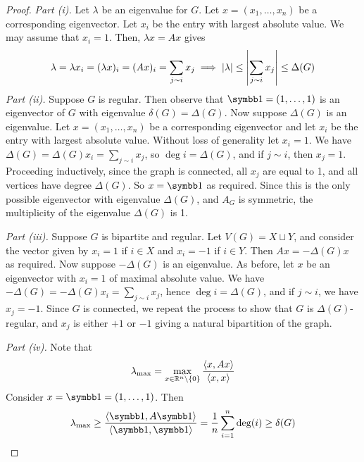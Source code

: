 \begin{proof}
	\emph{Part (i).}
	Let \( \lambda \) be an eigenvalue for \( G \).
	Let \( x = (x_1, \dots, x_n) \) be a corresponding eigenvector.
	Let \( x_i \) be the entry with largest absolute value.
	We may assume that \( x_i = 1 \).
	Then, \( \lambda x = Ax \) gives
	\[ \lambda = \lambda x_i = (\lambda x)_i = (Ax)_i = \sum_{j \sim i} x_j \implies \abs{\lambda} \leq \abs{\sum_{j \sim i} x_j} \leq \Delta(G) \]
	\emph{Part (ii).}
	Suppose \( G \) is regular.
	Then observe that \( \symbb 1 = (1, \dots, 1) \) is an eigenvector of \( G \) with eigenvalue \( \delta(G) = \Delta(G) \).
	Now suppose \( \Delta(G) \) is an eigenvalue.
	Let \( x = (x_1, \dots, x_n) \) be a corresponding eigenvector and let \( x_i \) be the entry with largest absolute value.
	Without loss of generality let \( x_i = 1 \).
	We have \( \Delta(G) = \Delta(G) x_i = \sum_{j \sim i} x_j \), so \( \deg i = \Delta(G) \), and if \( j \sim i \), then \( x_j = 1 \).
	Proceeding inductively, since the graph is connected, all \( x_j \) are equal to 1, and all vertices have degree \( \Delta(G) \).
	So \( x = \symbb 1 \) as required.
	Since this is the only possible eigenvector with eigenvalue \( \Delta(G) \), and \( A_G \) is symmetric, the multiplicity of the eigenvalue \( \Delta(G) \) is 1.

	\emph{Part (iii).}
	Suppose \( G \) is bipartite and regular.
	Let \( V(G) = X \sqcup Y \), and consider the vector given by \( x_i = 1 \) if \( i \in X \) and \( x_i = -1 \) if \( i \in Y \).
	Then \( Ax = -\Delta(G) x \) as required.
	Now suppose \( -\Delta(G) \) is an eigenvalue.
	As before, let \( x \) be an eigenvector with \( x_i = 1 \) of maximal absolute value.
	We have \( -\Delta(G) = -\Delta(G) x_i = \sum_{j \sim i} x_j \), hence \( \deg i = \Delta(G) \), and if \( j \sim i \), we have \( x_j = -1 \).
	Since \( G \) is connected, we repeat the process to show that \( G \) is \( \Delta(G) \)-regular, and \( x_j \) is either \( +1 \) or \( -1 \) giving a natural bipartition of the graph.

	\emph{Part (iv).}
	Note that
	\[ \lambda_{\mathrm{max}} = \max_{x \in \mathbb R^n \setminus \qty{0}} \frac{\left\langle{x, Ax}\right\rangle}{\left\langle{x,x}\right\rangle} \]
	Consider \( x = \symbb 1 = (1, \dots, 1) \).
	Then
	\[ \lambda_{\mathrm{max}} \geq \frac{\inner{\symbb 1, A\symbb 1}}{\inner{\symbb 1, \symbb 1}} = \frac{1}{n} \sum_{i=1}^n \deg(i) \geq \delta(G) \]
\end{proof}

